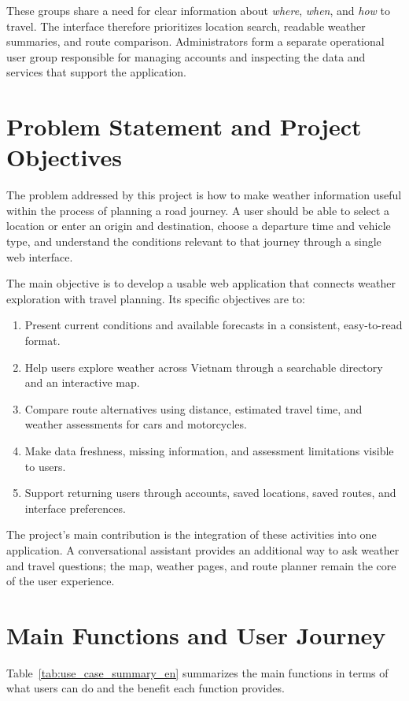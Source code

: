 These groups share a need for clear information about \textit{where}, \textit{when}, and \textit{how} to travel. The interface therefore prioritizes location search, readable weather summaries, and route comparison. Administrators form a separate operational user group responsible for managing accounts and inspecting the data and services that support the application.

\section{Problem Statement and Project Objectives}
The problem addressed by this project is how to make weather information useful within the process of planning a road journey. A user should be able to select a location or enter an origin and destination, choose a departure time and vehicle type, and understand the conditions relevant to that journey through a single web interface.

The main objective is to develop a usable web application that connects weather exploration with travel planning. Its specific objectives are to:
\begin{enumerate}[itemsep=0.25em]
    \item Present current conditions and available forecasts in a consistent, easy-to-read format.
    \item Help users explore weather across Vietnam through a searchable directory and an interactive map.
    \item Compare route alternatives using distance, estimated travel time, and weather assessments for cars and motorcycles.
    \item Make data freshness, missing information, and assessment limitations visible to users.
    \item Support returning users through accounts, saved locations, saved routes, and interface preferences.
\end{enumerate}

The project's main contribution is the integration of these activities into one application. A conversational assistant provides an additional way to ask weather and travel questions; the map, weather pages, and route planner remain the core of the user experience.

\section{Main Functions and User Journey}
Table~\ref{tab:use_case_summary_en} summarizes the main functions in terms of what users can do and the benefit each function provides.

